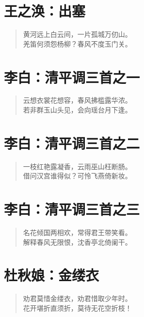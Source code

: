 \documentclass[12pt,oneside]{book}
\newenvironment{shici}{%
\begin{verse}\centering\yanti\large\hspace{12pt}}{\end{verse}}
\begin{document}
\begin{common-format}
\chapter{王之涣：出塞}
\begin{shici}
黄河远上白云间，一片孤城万仞山。\\
羌笛何须怨杨柳？春风不度玉门关。
\end{shici}

\chapter{李白：清平调三首之一}
\begin{shici}
云想衣裳花想容，春风拂槛露华浓。\\
若非群玉山头见，会向瑶台月下逢。
\end{shici}

\chapter{李白：清平调三首之二}
\begin{shici}
一枝红艳露凝香，云雨巫山枉断肠。\\
借问汉宫谁得似？可怜飞燕倚新妆。
\end{shici}

\chapter{李白：清平调三首之三}
\begin{shici}
名花倾国两相欢，常得君王带笑看。\\
解释春风无限恨，沈香亭北倚阑干。
\end{shici}

\chapter{杜秋娘：金缕衣}
\begin{shici}
劝君莫惜金缕衣，劝君惜取少年时。\\
花开堪折直须折，莫待无花空折枝！
\end{shici}



\end{common-format}
\end{document}
